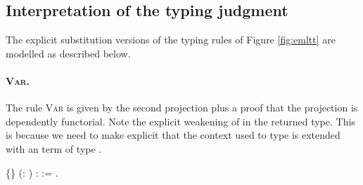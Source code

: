 \subsection{Interpretation of the typing judgment}


  \label{sec:interp}


  The explicit substitution versions of the typing rules of Figure
  \ref{fig:emltt} are modelled as described below.


  \paragraph{\textsc{Var}.} 


  The rule \textsc{Var} is given by the second projection plus a proof
  that the projection is dependently functorial. Note the explicit
  weakening of  in the returned type. This is because we need to
  make explicit that the context used to type  is extended with an
  term of type .


\begin{coqdoccode}
\coqdocemptyline
\coqdocnoindent
{}  \{\} (: ) :   := \coqdocnotation{(}   \coqdocnotation{;}  \coqdocnotation{)}.\coqdoceol
\coqdocemptyline
\coqdocemptyline
\end{coqdoccode}
